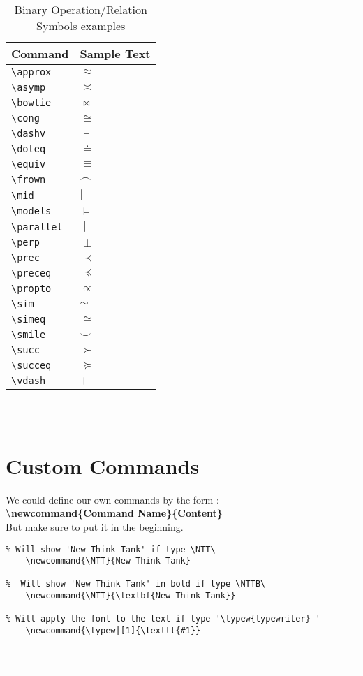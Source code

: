 \documentclass[a4paper,12pt,titlepage]{article}
\begin{document}
\begin{table}[H]
\center
	\begin{tabular}{l|l}
	\hline
	\textbf{Command} & \textbf{Sample Text} \\
	\hline
	\hline
	
	\verb|\approx| & $\approx$ \\
	\verb|\asymp| & $\asymp$ \\
	\verb|\bowtie| & $\bowtie$ \\
	\verb|\cong| & $\cong$ \\
	\verb|\dashv| & $\dashv$  \\
	\verb|\doteq| &  $\doteq$\\
	\verb|\equiv| &  $\equiv$\\
	\verb|\frown| & $\frown$\\
	\verb|\mid| &  $\mid$\\
	\verb|\models| & $\models$\\
	\verb|\parallel| & $\parallel$\\
	\verb|\perp| & $\perp$\\
	\verb|\prec| & $\prec$\\
	\verb|\preceq| & $\preceq$\\
	\verb|\propto| & $\propto$\\
	\verb|\sim | & $\sim$  \\
	\verb|\simeq | & $\simeq$  \\
	\verb|\smile | & $\smile$  \\
	\verb|\succ | & $\succ$  \\
	\verb|\succeq | & $\succeq$  \\
	\verb|\vdash | & $\vdash$  \\

	\end{tabular}
	\caption{Binary Operation/Relation Symbols examples}
\end{table}
~\\
\rule{\linewidth}{0.1mm}


\section{Custom Commands}
We could define our own commands by the form : 
\\
\textbf{\textbackslash newcommand\{Command Name\}\{Content\}}
\\
But make sure to put it in the beginning.

\begin{lstlisting}  
% Will show 'New Think Tank' if type \NTT\
	\newcommand{\NTT}{New Think Tank}
	
%  Will show 'New Think Tank' in bold if type \NTTB\
	\newcommand{\NTT}{\textbf{New Think Tank}}

% Will apply the font to the text if type '\typew{typewriter} '
	\newcommand{\typew|[1]{\texttt{#1}}
\end{lstlisting}  
~\\
 \rule{\linewidth}{0.1mm}
 
\end{document}
